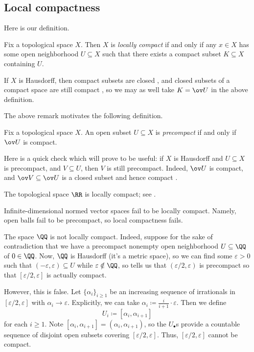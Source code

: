 \documentclass[../notes.tex]{subfiles}
\begin{document}
\subsection{Local compactness}
Here is our definition.
\begin{definition}
	Fix a topological space $X$. Then $X$ is \textit{locally compact} if and only if any $x\in X$ has some open neighborhood $U\subseteq X$ such that there exists a compact subset $K\subseteq X$ containing $U$.
\end{definition}
\begin{remark} \label{rem:get-precompact}
	If $X$ is Hausdorff, then compact subsets are closed \cite[Corollary~4.13]{elber-top}, and closed subsets of a compact space are still compact \cite[Lemma~4.10]{elber-top}, so we may as well take $K=\ov U$ in the above definition.
\end{remark}
The above remark motivates the following definition.
\begin{definition}[precompact]
	Fix a topological space $X$. An open subset $U\subseteq X$ is \textit{precompact} if and only if $\ov U$ is compact.
\end{definition}
\begin{remark} \label{rem:smaller-precompact}
	Here is a quick check which will prove to be useful: if $X$ is Hausdorff and $U\subseteq X$ is precompact, and $V\subseteq U$, then $V$ is still precompact. Indeed, $\ov U$ is compact, and $\ov V\subseteq\ov U$ is a closed subset and hence compact \cite[Lemma~4.10]{elber-top}.
\end{remark}
\begin{example}
	The topological space $\RR$ is locally compact; see \cite[Example~4.71]{elber-top}.
\end{example}
\begin{nex}
	Infinite-dimensional normed vector spaces fail to be locally compact. Namely, open balls fail to be precompact, so local compactness fails.
\end{nex}
\begin{nex}
	The space $\QQ$ is not locally compact. Indeed, suppose for the sake of contradiction that we have a precompact nonempty open neighborhood $U\subseteq\QQ$ of $0\in\QQ$. Now, $\QQ$ is Hausdorff (it's a metric space), so we can find some $\varepsilon>0$ such that $(-\varepsilon,\varepsilon)\subseteq U$ while $\varepsilon\notin\QQ$, so  tells us that $(\varepsilon/2,\varepsilon)$ is precompact so that $[\varepsilon/2,\varepsilon]$ is actually compact.

	However, this is false. Let $\{\alpha_i\}_{i\ge1}$ be an increasing sequence of irrationals in $[\varepsilon/2,\varepsilon]$ with $\alpha_i\to\varepsilon$. Explicitly, we can take $\alpha_i\coloneqq\frac i{i+1}\cdot\varepsilon$. Then we define
	\[U_i\coloneqq[\alpha_i,\alpha_{i+1}]\]
	for each $i\ge1$. Note $[\alpha_i,\alpha_{i+1}]=(\alpha_i,\alpha_{i+1})$, so the $U_\bullet$s provide a countable sequence of disjoint open subsets covering $[\varepsilon/2,\varepsilon]$. Thus, $[\varepsilon/2,\varepsilon]$ cannot be compact.
\end{nex}
\end{document}
